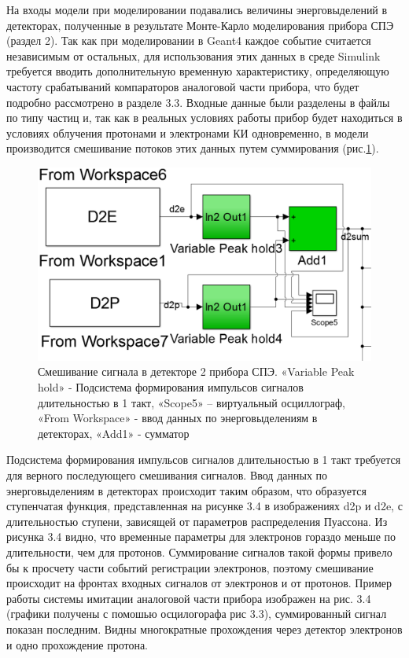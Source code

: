 На входы модели при моделировании подавались величины энерговыделений в детекторах, полученные в результате Монте-Карло моделирования прибора СПЭ (раздел 2). Так как при моделировании в Geant4 каждое событие считается независимым от остальных, для использования этих данных в среде Simulink требуется вводить дополнительную временную характеристику, определяющую частоту срабатываний компараторов аналоговой части прибора, что будет подробно рассмотрено в разделе 3.3. 
Входные данные были разделены в файлы по типу частиц и, так как в реальных условиях работы прибор будет находиться в условиях облучения протонами и электронами КИ одновременно, в модели производится смешивание потоков этих данных путем суммирования (рис.\ref{fig:simulink_summ}).
\begin{figure}
\centering
\includegraphics[width=0.7\linewidth]{images/simulink_summ}
\caption{Смешивание сигнала в детекторе 2 прибора СПЭ. «Variable Peak hold» - Подсистема формирования импульсов сигналов длительностью в 1 такт, «Scope5» – виртуальный осциллограф, «From Workspace» - ввод данных по энерговыделениям в детекторах, «Add1» - сумматор}
\label{fig:simulink_summ}
\end{figure}






Подсистема формирования импульсов сигналов длительностью в 1 такт требуется для верного последующего смешивания сигналов. Ввод данных по энерговыделениям в детекторах происходит таким образом, что образуется ступенчатая функция, представленная на рисунке 3.4 в изображениях d2p и d2e, с длительностью ступени, зависящей от параметров распределения Пуассона. Из рисунка 3.4 видно, что временные параметры для электронов гораздо меньше по длительности, чем для протонов. Суммирование сигналов такой формы привело бы к просчету части событий регистрации электронов, поэтому смешивание происходит на фронтах входных сигналов от электронов и от протонов.
Пример работы системы имитации аналоговой части прибора изображен на рис. 3.4 (графики получены с помошью осцилогорафа рис 3.3), суммированный сигнал показан последним. Видны многократные прохождения через детектор электронов и одно прохождение протона. 

